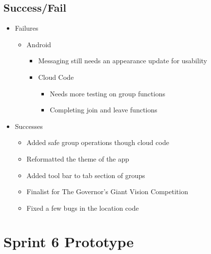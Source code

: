 \subsection{Success/Fail}
\begin{itemize}
	\item Failures
	\begin{itemize}
		\item Android
		\begin{itemize}
			\item Messaging still needs an appearance update for usability
		\end{itemize}
		\begin{itemize}
			\item Cloud Code
			\begin{itemize}	
				\item Needs more testing on group functions
				\item Completing join and leave functions
			\end{itemize}
		\end{itemize}
	\end{itemize}
	\item Successes
	\begin{itemize}
		\item Added safe group operations though cloud code
		\item Reformatted the theme of the app
		\item Added tool bar to tab section of groups
		\item Finalist for The Governor's Giant Vision Competition
		\item Fixed a few bugs in the location code
	\end{itemize}
\end{itemize}


\section{Sprint 6 Prototype}

